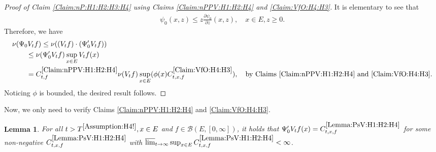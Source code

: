 \documentclass[12pt,a4paper]{amsart}
\numberwithin{equation}{section}
\theoremstyle{plain}
\newtheorem{lem}[thm]{Lemma}
\theoremstyle{definition}
\theoremstyle{remark}
\newcounter{N}
\newcounter{n}[N]
\begin{document}
\begin{proof}[{Proof of Claim \ref{Claim:nP:H1:H2:H3:H4} using Claims \ref{Claim:nPPV:H1:H2:H4} and \ref{Claim:VfO:H4:H3}}]
It is elementary to see that
\begin{align}\label{e:derofpsi0}
  \psi_0(x,z)
  \leq z \frac{\partial \psi_0}{\partial z}(x,z),
  \quad x\in E, z\geq 0.
  \end{align}
Therefore, we have
\begin{align}
  \MoveEqLeft \nu(\Psi_0 V_tf)
\leq \nu((V_tf)\cdot (\Psi_0' V_tf))
\\&  \leq  \nu(\Psi_0' V_tf) \sup_{x\in E}V_tf(x)
 \\& =   C^{\ref{Claim:nPPV:H1:H2:H4}}_{t,f} \nu(V_tf) \sup_{x\in E} (\phi(x) C^{\ref{Claim:VfO:H4:H3}}_{t,x,f}),\quad\text{by Claims \ref{Claim:nPPV:H1:H2:H4} and \ref{Claim:VfO:H4:H3}}.
  \end{align}
Noticing $\phi$ is bounded, the desired result follows.
\end{proof}
	
	Now, we only need to verify Claims \ref{Claim:nPPV:H1:H2:H4} and \ref{Claim:VfO:H4:H3}.

\begin{lem} \label{Lemma:PsV:H1:H2:H4}
	For all $t> T^{\ref{Assumption:H4!}}, x\in E$ and $f\in \mathcal B(E,[0,\infty])$, it holds that $\Psi_0'V_tf(x) = C^{\ref{Lemma:PsV:H1:H2:H4}}_{t,x,f}$ for some non-negative $C^{\ref{Lemma:PsV:H1:H2:H4}}_{t,x,f}$ with
$\varlimsup_{t\to \infty} \sup_{x\in E} C^{\ref{Lemma:PsV:H1:H2:H4}}_{t,x,f} <\infty$.
\end{lem}
\end{document}
